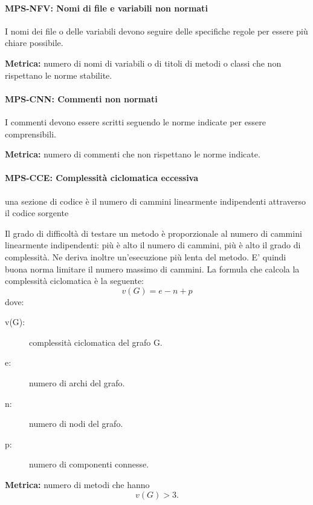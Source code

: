 \documentclass[../../norme-di-progetto.tex]{subfiles}
\begin{document}
\paragraph{MPS-NFV: Nomi di file e variabili non normati}%
\label{par:MPS-NFV_nomi_file_variabili_non_normati}

I nomi dei file o delle variabili devono seguire delle specifiche regole per essere più chiare possibile.

\textbf{Metrica:} numero di nomi di variabili o di titoli di metodi o classi che non rispettano le norme stabilite.

\paragraph{MPS-CNN: Commenti non normati}%
\label{par:MPS-CNN_commenti_non_normati}

I commenti devono essere scritti seguendo le norme indicate per essere comprensibili.

\textbf{Metrica:} numero di commenti che non rispettano le norme indicate.

\paragraph{MPS-CCE: Complessità ciclomatica eccessiva}%
\label{par:MPS-CCE_complessita_ciclomatica_eccessiva}
una sezione di codice è il numero di cammini linearmente indipendenti attraverso il codice sorgente

Il grado di difficoltà di testare un metodo è proporzionale al numero di cammini linearmente indipendenti: più è alto il numero di cammini, più è alto il grado di complessità.
Ne deriva inoltre un'esecuzione più lenta del metodo. E' quindi buona norma limitare il numero massimo di cammini.
La formula che calcola la complessità ciclomatica è la seguente:
\[
  v(G) = e - n + p
\]
dove:
\begin{description}
  \item[v(G):] complessità ciclomatica del grafo G. %
  \item[e:] numero di archi del grafo.
  \item[n:] numero di nodi del grafo.
  \item[p:] numero di componenti connesse.
\end{description}
\textbf{Metrica:} numero di metodi che hanno \[v(G) > 3.\]
\end{document}
